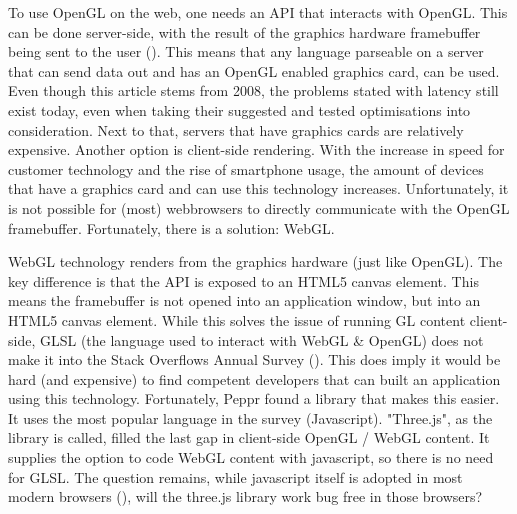 To use OpenGL on the web, one needs an API that interacts with OpenGL. This can be done server-side, with the result of the graphics hardware framebuffer being sent to the user (\cite{CRRS}). This means that any language parseable on a server that can send data out and has an OpenGL enabled graphics card, can be used. Even though this article stems from 2008, the problems stated with latency still exist today, even when taking their suggested and tested optimisations into consideration. Next to that, servers that have graphics cards are relatively expensive. Another option is client-side rendering. With the increase in speed for customer technology and the rise of smartphone usage, the amount of devices that have a graphics card and can use this technology increases. Unfortunately, it is not possible for (most) webbrowsers to directly communicate with the OpenGL framebuffer. Fortunately, there is a solution: WebGL.

\cite{webGL}

WebGL technology renders from the graphics hardware (just like OpenGL). The key difference is that the API is exposed to an HTML5 canvas element. This means the framebuffer is not opened into an application window, but into an HTML5 canvas element. While this solves the issue of running GL content client-side, GLSL (the language used to interact with WebGL \& OpenGL) does not make it into the Stack Overflows Annual Survey (\cite{stackoverflowDeveloperSurvey}). This does imply it would be hard (and expensive) to find competent developers that can built an application using this technology.
Fortunately, Peppr found a library that makes this easier. It uses the most popular language in the survey (Javascript). "Three.js", as the library is called, filled the last gap in client-side OpenGL / WebGL content. It supplies the option to code WebGL content with javascript, so there is no need for GLSL. The question remains, while javascript itself is adopted in most modern browsers (\cite{javascriptSupport}), will the three.js library work bug free in those browsers?


\newpage





